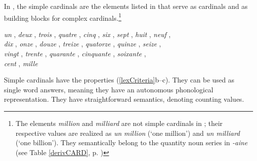 \documentclass[output=paper]{langsci/langscibook}
\begin{document}
In , the simple cardinals  are the elements listed in  that serve as cardinals  and as building blocks for complex cardinals.\footnote{The elements \emph{million} and \emph{milliard} are not simple cardinals  in ; their respective values are realized as \emph{un million} (`one million') and \emph{un milliard} (`one billion'). They semantically belong to the quantity noun series in \emph{-aine} (see Table \ref{derivCARD}, p. \pageref{derivCARD})}

\ea\label{simpleCardinals}
\emph{un} , \emph{deux} , \emph{trois} , \emph{quatre} , \emph{cinq} , \emph{six} , \emph{sept} , \emph{huit} , \emph{neuf} , \\\emph{dix} , \emph{onze} , \emph{douze} , \emph{treize} , \emph{quatorze} , \emph{quinze} , \emph{seize} , \\\emph{vingt} , \emph{trente} , \emph{quarante} , \emph{cinquante} , \emph{soixante} , \\\emph{cent} , \emph{mille} 
\z



Simple cardinals  have the properties (\ref{lexCriteria}b--c). They can be used as single word answers, meaning they have an autonomous phonological representation. They have straightforward semantics, denoting counting values.
\end{document}
